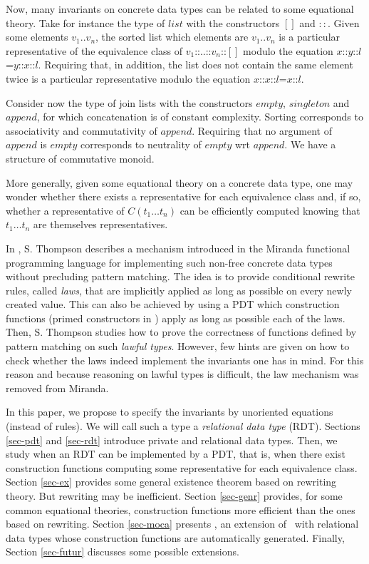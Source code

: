Now, many invariants on concrete data types can be related to some
equational theory. Take for instance the type of $list$ with the
constructors $[]$ and $::$. Given some elements $v_1..v_n$, the sorted
list which elements are $v_1..v_n$ is a particular representative of
the equivalence class of $v_1$::..::$v_n$::$[]$ modulo the equation
$x$::$y$::$l$=$y$::$x$::$l$. Requiring that, in addition, the list
does not contain the same element twice is a particular representative
modulo the equation $x$::$x$::$l$=$x$::$l$.

Consider now the type of join lists with the constructors $empty$,
$singleton$ and $append$, for which concatenation is of constant
complexity. Sorting corresponds to associativity and commutativity of
$append$. Requiring that no argument of $append$ is $empty$
corresponds to neutrality of $empty$ wrt $append$. We have a structure
of commutative monoid.

More generally, given some equational theory on a concrete data type,
one may wonder whether there exists a representative for each
equivalence class and, if so, whether a representative of $C(t_1\ldots
t_n)$ can be efficiently computed knowing that $t_1\ldots t_n$ are
themselves representatives.

In \cite{thompson86lfp,thompson90scp}, S. Thompson describes a
mechanism introduced in the Miranda functional programming language
for implementing such non-free concrete data types without precluding
pattern matching. The idea is to provide conditional rewrite rules,
called {\em laws}, that are implicitly applied as long as possible on
every newly created value. This can also be achieved by using a PDT
which construction functions (primed constructors in
\cite{thompson86lfp}) apply as long as possible each of the laws.
Then, S. Thompson studies how to prove the correctness of functions
defined by pattern matching on such {\em lawful types}. However, few
hints are given on how to check whether the laws indeed implement the
invariants one has in mind. For this reason and because reasoning on
lawful types is difficult, the law mechanism was removed from
Miranda.\vsp[2mm]

In this paper, we propose to specify the invariants by unoriented
equations (instead of rules). We will call such a type a {\em
relational data type} (RDT). Sections \ref{sec-pdt} and \ref{sec-rdt}
introduce private and relational data types. Then, we study when an
RDT can be implemented by a PDT, that is, when there exist
construction functions computing some representative for each
equivalence class. Section \ref{sec-ex} provides some general
existence theorem based on rewriting theory. But rewriting may be
inefficient. Section \ref{sec-genr} provides, for some common
equational theories, construction functions more efficient than the
ones based on rewriting. Section \ref{sec-moca} presents \moca, an
extension of \ocaml\ with relational data types whose construction
functions are automatically generated. Finally, Section
\ref{sec-futur} discusses some possible extensions.
